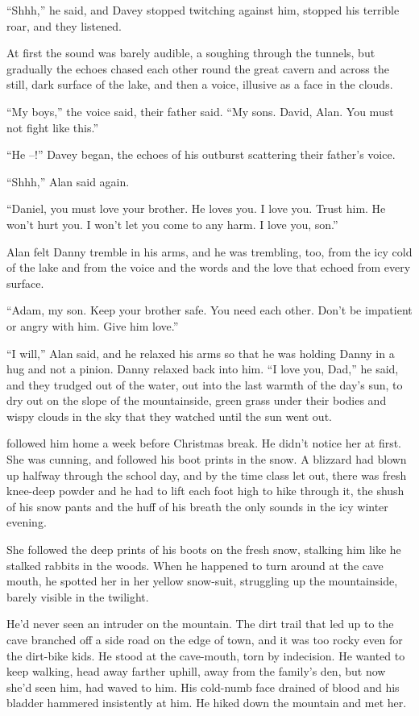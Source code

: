 ``Shhh,'' he said, and Davey stopped twitching against him, stopped
his terrible roar, and they listened.

At first the sound was barely audible, a soughing through the tunnels,
but gradually the echoes chased each other round the great cavern and
across the still, dark surface of the lake, and then a voice, illusive
as a face in the clouds.

``My boys,'' the voice said, their father said.  ``My sons.  David,
Alan.  You must not fight like this.''

``He --!'' Davey began, the echoes of his outburst scattering their
father's voice.

``Shhh,'' Alan said again.

``Daniel, you must love your brother.  He loves you.  I love you. 
Trust him.  He won't hurt you.  I won't let you come to any harm.  I
love you, son.''

Alan felt Danny tremble in his arms, and he was trembling, too, from
the icy cold of the lake and from the voice and the words and the love
that echoed from every surface.

``Adam, my son.  Keep your brother safe.  You need each other.  Don't
be impatient or angry with him.  Give him love.''

``I will,'' Alan said, and he relaxed his arms so that he was holding
Danny in a hug and not a pinion.  Danny relaxed back into him.  ``I
love you, Dad,'' he said, and they trudged out of the water, out into
the last warmth of the day's sun, to dry out on the slope of the
mountainside, green grass under their bodies and wispy clouds in the
sky that they watched until the sun went out.

 followed him home a week before Christmas break.  He didn't
notice her at first.  She was cunning, and followed his boot prints in
the snow.  A blizzard had blown up halfway through the school day, and
by the time class let out, there was fresh knee-deep powder and he had
to lift each foot high to hike through it, the shush of his snow pants
and the huff of his breath the only sounds in the icy winter evening.

She followed the deep prints of his boots on the fresh snow, stalking
him like he stalked rabbits in the woods.  When he happened to turn
around at the cave mouth, he spotted her in her yellow snow-suit,
struggling up the mountainside, barely visible in the twilight.

He'd never seen an intruder on the mountain.  The dirt trail that led
up to the cave branched off a side road on the edge of town, and it
was too rocky even for the dirt-bike kids.  He stood at the
cave-mouth, torn by indecision.  He wanted to keep walking, head away
farther uphill, away from the family's den, but now she'd seen him,
had waved to him.  His cold-numb face drained of blood and his bladder
hammered insistently at him.  He hiked down the mountain and met her.

